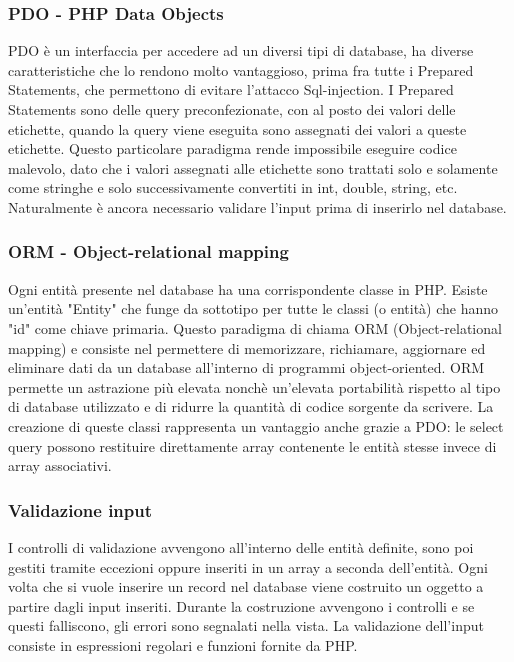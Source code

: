 \subsubsection{PDO - PHP Data Objects}
PDO è un interfaccia per accedere ad un diversi tipi di database, ha diverse caratteristiche che lo rendono molto vantaggioso, prima fra tutte i Prepared Statements, che permettono di evitare l'attacco Sql-injection.
I Prepared Statements sono delle query preconfezionate, con al posto dei valori delle etichette, quando la query viene eseguita sono assegnati dei valori a queste etichette. Questo particolare paradigma rende impossibile eseguire codice malevolo, dato che i valori assegnati alle etichette sono trattati solo e solamente come stringhe e solo successivamente convertiti in int, double, string, etc. Naturalmente è ancora necessario validare l'input prima di inserirlo nel database.
\subsubsection{ORM - Object-relational mapping}
Ogni entità presente nel database ha una corrispondente classe in PHP. Esiste un'entità "Entity" che funge da sottotipo per tutte le classi (o entità) che hanno "id" come chiave primaria. Questo paradigma di chiama ORM (Object-relational mapping) e consiste nel permettere di memorizzare, richiamare, aggiornare ed eliminare dati da un database all’interno di programmi object-oriented. ORM permette un astrazione più elevata nonchè un'elevata portabilità rispetto al tipo di database utilizzato e di ridurre la quantità di codice sorgente da scrivere. La creazione di queste classi rappresenta un vantaggio anche grazie a PDO: le select query possono restituire direttamente array contenente le entità stesse invece di array associativi.
\subsubsection{Validazione input}
I controlli di validazione avvengono all'interno delle entità definite, sono poi gestiti tramite eccezioni oppure inseriti in un array a seconda dell'entità. Ogni volta che si vuole inserire un record nel database viene costruito un oggetto a partire dagli input inseriti. Durante la costruzione avvengono i controlli e se questi falliscono, gli errori sono segnalati nella vista. La validazione dell'input consiste in espressioni regolari e funzioni fornite da PHP.


